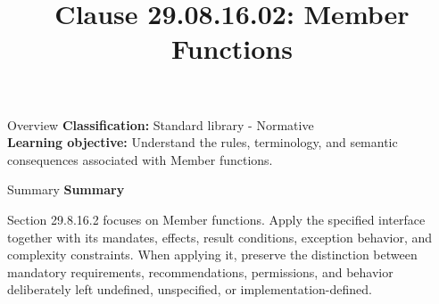 \documentclass[10pt,letterpaper]{article}
\title{Clause 29.08.16.02: Member Functions}
\author{}
\date{}
\begin{document}
\maketitle
\begin{CornellOverviewBox}{Overview}
\textbf{Classification:} Standard library - Normative\\[2pt]
\textbf{Learning objective:} Understand the rules, terminology, and semantic consequences associated with Member functions.
\end{CornellOverviewBox}\begin{CornellSummaryBox}{Summary}
{\sffamily\bfseries\color{Accent} Summary}\par\vspace{3pt}Section 29.8.16.2 focuses on Member functions. Apply the specified interface together with its mandates, effects, result conditions, exception behavior, and complexity constraints. When applying it, preserve the distinction between mandatory requirements, recommendations, permissions, and behavior deliberately left undefined, unspecified, or implementation-defined.
\end{CornellSummaryBox}
\end{document}
